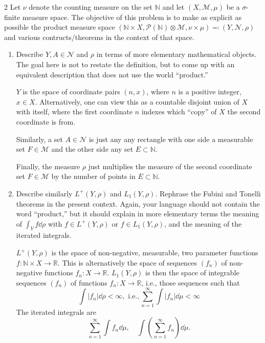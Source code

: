 \documentclass[11pt]{article}
\begin{document}
\begin{problem}{2}
  Let \(\nu\) denote the counting measure on the set \( \mathbb{N} \) and let \( (X, \mathcal{M}, \mu) \) be a \(\sigma\)-finite measure space.
  The objective of this problem is to make as explicit as possible the product measure space \( (\mathbb{N} \times X, \mathcal{P}(\mathbb{N}) \otimes \mathcal{M}, \nu \times \mu) \eqcolon (Y, \mathcal{N}, \rho)\) and various contructs/theorems in the context of that space.
  \begin{enumerate}[label=\alph*.]
    \item Describe \( Y, A \in \mathcal{N} \) and \( \rho \) in terms of more elementary mathematical objects.
          The goal here is not to restate the definition, but to come up with an equivalent description that does not use the world ``product.''
          \begin{answer}
            \( Y \) is the space of coordinate pairs \( (n, x) \), where \( n \) is a positive integer, \( x \in X \).
            Alternatively, one can view this as a countable disjoint union of \( X \) with itself, where the first coordinate \( n \) indexes which ``copy'' of \( X \) the second coordinate is from.

            Similarly, a set \( A \in \mathcal{N} \) is just any any rectangle with one side a measurable set \( F \in \mathcal{M} \) and the other side any set \( E \subset \mathbb{N} \).

            Finally, the measure \(\rho\) just multiplies the measure of the second coordinate set \( F \in \mathcal{M} \) by the number of points in \( E \subset \mathbb{N} \).
          \end{answer}
    \item Describe similarly \( L^+(Y,\rho) \) and \( L_1(Y,\rho) \).
          Rephrase the Fubini and Tonelli theorems in the present context.
          Again, your language should not contain the word ``product,'' but it should explain in more elementary terms the meaning of \( \int_Y f \dd{\rho} \) with \( f \in L^+(Y,\rho) \) or \( f \in L_1(Y,\rho) \), and the meaning of the iterated integrals.
          \begin{answer}
            \( L^+(Y, \rho) \) is the space of non-negative, measurable, two parameter functions \( f: \mathbb{N} \times X \rightarrow \mathbb{R} \).
            This is alternatively the space of sequences \( (f_n) \) of non-negative functions \( f_n: X \rightarrow \mathbb{R} \).
            \( L_1(Y, \rho) \) is then the space of integrable sequences \( (f_n) \) of functions \( f_n: X \rightarrow \mathbb{R} \), i.e., those sequences such that
            \begin{equation}
            \label{eq:5}
            \int |f_n| \dd{\rho} < \infty, \text{ i.e.}, \sum\limits_{n=1}^{\infty} \int |f_n| \dd\mu < \infty
          \end{equation}
          The iterated integrals are
          \begin{equation}
          \label{eq:8}
          \sum\limits_{n=1}^{\infty} \int f_n \dd{\mu}, \quad \int \left(\sum\limits_{n=1}^{\infty} f_n \right) \dd{\mu}.
        \end{equation}


\end{answer}
\end{enumerate}
\end{problem}
\end{document}
